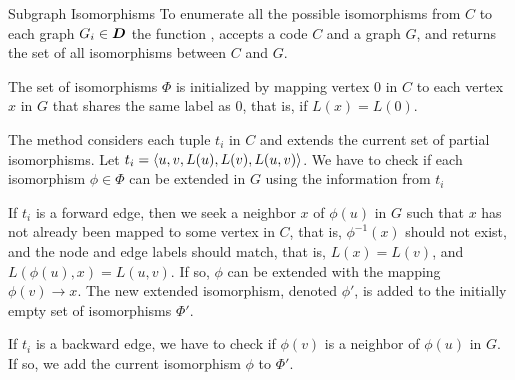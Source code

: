 \begin{frame}{Subgraph Isomorphisms}
To
enumerate all the possible isomorphisms from $C$ to each graph $G_i \in
{\boldsymbol D}$ the function \algISO,
accepts a code $C$ and a graph $G$, and
returns the set of all isomorphisms between $C$ and $G$.

\medskip
The set of isomorphisms $\Phi$ is initialized by mapping vertex $0$ in
$C$ to each vertex $x$ in $G$ that shares the same label as $0$, that is, if
$L(x) = L(0)$.

\medskip
The method considers each tuple $t_i$ in $C$ and extends the current set
of partial isomorphisms. Let $t_i = \langle u, v, L(u), L(v), L(u,v) \rangle$.
We have to check if each isomorphism $\phi \in \Phi$ can be extended in
$G$ using the information from $t_i$

\medskip
If $t_i$ is a forward edge, then
we seek a neighbor $x$ of $\phi(u)$ in $G$ such that $x$ has not already
been mapped to some vertex in $C$, that is,
$\phi^{-1}(x)$ should not exist, and
the node and edge labels should match, that is, $L(x) = L(v)$, and
$L(\phi(u),x) = L(u,v)$. If so, $\phi$ can be extended with the mapping
$\phi(v) \to x$. The new extended isomorphism, denoted $\phi'$, is added
to the initially empty set of isomorphisms $\Phi'$. 

\medskip
If $t_i$ is a
backward edge, we have to check if $\phi(v)$ is a neighbor of $\phi(u)$
in $G$. If so, we add the current isomorphism $\phi$ to $\Phi'$. 

\end{frame}



